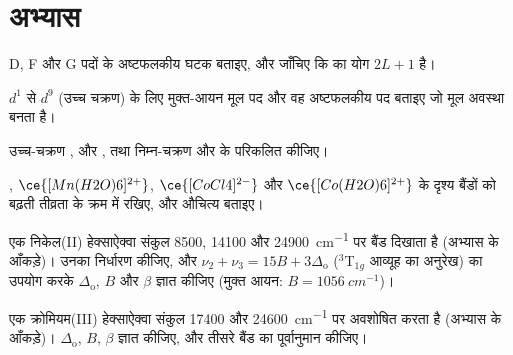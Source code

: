 \section{अभ्यास}

\begin{exercise}[$\star$]\label{exo:b3:complex-spectra-magnetism:1}
D, F और G पदों के अष्टफलकीय घटक बताइए, और जाँचिए कि
 का योग $2L + 1$ है।
\end{exercise}

\begin{exercise}[$\star$]\label{exo:b3:complex-spectra-magnetism:2}
$d^1$ से $d^9$ (उच्च चक्रण) के लिए मुक्त-आयन मूल पद और वह अष्टफलकीय पद बताइए जो
मूल अवस्था बनता है।
\end{exercise}

\begin{exercise}[$\star$]\label{exo:b3:complex-spectra-magnetism:3}
उच्च-चक्रण ,  और , तथा निम्न-चक्रण
 और  के  परिकलित कीजिए।
\end{exercise}

\begin{exercise}[$\star$]\label{exo:b3:complex-spectra-magnetism:4}
, $\ce{[Mn(H2O)6]^{2+}}$, $\ce{[CoCl4]^{2-}}$ और
$\ce{[Co(H2O)6]^{2+}}$ के दृश्य बैंडों को बढ़ती तीव्रता के क्रम में रखिए, और औचित्य बताइए।
\end{exercise}

\begin{exercise}[$\star\star$]\label{exo:b3:complex-spectra-magnetism:5}
एक निकेल(II) हेक्साऐक्वा संकुल 8500, 14100 और \qty{24900}{cm^{-1}} पर बैंड दिखाता है (अभ्यास के
आँकड़े)। उनका निर्धारण कीजिए, और $\nu_2 + \nu_3 = 15B + 3\Delta_{\mathrm o}$ ($^3$T$_{1g}$
आव्यूह का अनुरेख) का उपयोग करके $\Delta_{\mathrm o}$, $B$ और $\beta$ ज्ञात कीजिए (मुक्त आयन: $B = \qty{1056}{cm^{-1}}$)।
\end{exercise}

\begin{exercise}[$\star\star$]\label{exo:b3:complex-spectra-magnetism:6}
एक क्रोमियम(III) हेक्साऐक्वा संकुल 17400 और \qty{24600}{cm^{-1}} पर अवशोषित करता है (अभ्यास के
आँकड़े)। $\Delta_{\mathrm o}$, $B$, $\beta$ ज्ञात कीजिए, और तीसरे बैंड का पूर्वानुमान कीजिए।
\end{exercise}

